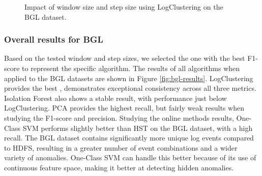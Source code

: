 \begin{figure}[t]
    \vspace{0.7cm}

    \caption{Impact of window size and step size using LogClustering on the BGL dataset.}
    \label{fig:logclustering_all_metrics}

    \vspace{0.5cm}
    \centering
  

\end{figure}





\subsubsection{Overall results for BGL}
Based on the tested window and step sizes, we selected the one with the best F1-score to represent the specific algorithm. The results of all algorithms when applied to the BGL datasets are shown in Figure \ref{fig:bgl-results}.  LogClustering provides the best , demonstrates exceptional consistency across all three metrics. Isolation Forest also shows a stable result, with performance just below LogClustering. PCA provides the highest recall, but fairly weak results when studying the F1-score and precision. Studying the online methods results, One-Class SVM performs slightly better than HST on the BGL dataset, with a high recall. The BGL dataset contains significantly more unique log events compared to HDFS, resulting in a greater number of event combinations and a wider variety of anomalies. One-Class SVM can handle this better because of its use of continuous feature space, making it better at detecting hidden anomalies.

